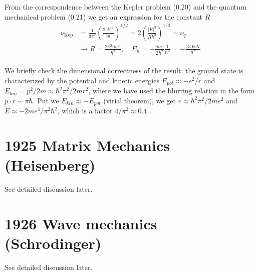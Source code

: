 From the correspondence between the Kepler problem (0.20) and the quantum mechanical problem (0.21) we get an expression for the constant $R$\\
\begin{equation}
\begin{aligned} \nu_{\mathrm{Kep}} &=\frac{1}{\pi e^{2}}\left(\frac{2|E|^{3}}{m}\right)^{1 / 2}=2\left(\frac{|E|^{3}}{R h^{3}}\right)^{1 / 2}=\nu_{q} \\ & \rightarrow R=\frac{2 \pi^{2} m e^{4}}{h^{3}}, \quad E_{n}=-\frac{m e^{4}}{2 \hbar^{2}} \frac{1}{n^{2}}=-\frac{13.6 \mathrm{eV}}{n^{2}} \end{aligned}
\end{equation}\\
We briefly check the dimensional correctness of the result: the ground state is characterized by the potential and kinetic energies $E_{pot}\approx -e^2/r$ and $E_{kin} = p^2/2m \approx \hbar^2\pi^2/2mr^2$, where we
have used the blurring relation in the form $p\cdot r\sim\pi\hbar$. Put
we $E_{kin}\approx -E_{pot}$ (virial theorem), we get $r \approx \hbar^2\pi^2/2me^2$ and
$E \approx -2me^4/\pi^2\hbar^2$, which is a factor $4/\pi^2\approx 0.4$ .

\section{1925 Matrix Mechanics (Heisenberg)}
See detailed discussion later.
\section{1926 Wave mechanics (Schrodinger)}
See detailed discussion later.
